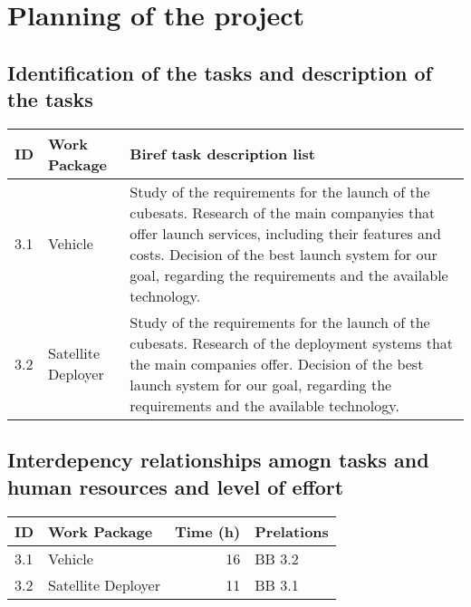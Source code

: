\documentclass[12pt, titlepage]{article}
\begin{document}
\maketitle

\pagebreak


\section{Planning of the project}


\subsection{Identification of the tasks and description of the tasks}
\begin{tabular}{ | l | p{4cm} | p{8cm} |}
\hline
ID & Work Package & Biref task description list \\ \hline
3.1 & Vehicle  & Study of the requirements for the launch of the cubesats. \newline
Research of the main companyies that offer launch services, including their features and costs. \newline
Decision of the best launch system for our goal, regarding the requirements and the available technology. \\ \hline
3.2 & Satellite Deployer & Study of the requirements for the launch of the cubesats. \newline
Research of the deployment systems that the main companies offer. \newline
Decision of the best launch system for our goal, regarding the requirements and the available technology. \\ \hline

\hline
\end{tabular}


\subsection{Interdepency relationships amogn tasks and human resources and level of effort}
\begin{tabular}{ | l | p{7cm} | r | p{3cm} | }
\hline
ID & Work Package & Time (h) & Prelations \\ \hline
3.1 & Vehicle & 16 & BB 3.2 \\ \hline
3.2 & Satellite Deployer & 11 & BB 3.1  \\ \hline

\hline
\end{tabular}
\end{document}
